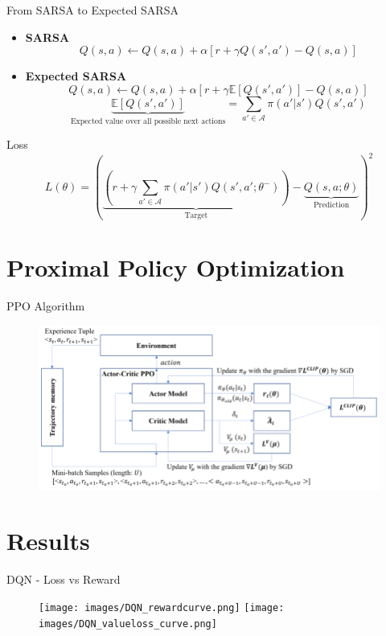 \documentclass[serif]{beamer}  %
\begin{document}
\begin{frame}{From SARSA to Expected SARSA}
    \begin{itemize}
        \item \textbf{SARSA}
        $$Q(s, a) \leftarrow Q(s, a) + \alpha \left[ r + \gamma Q(s', a') - Q(s, a) \right]$$
        \item \textbf{Expected SARSA}
        $$Q(s, a) \leftarrow Q(s, a) + \alpha \left[ r + \gamma \mathbb{E}[Q(s', a')] - Q(s, a) \right]$$
        $$\underbrace{\mathbb{E}[Q(s', a')]}_{\text{Expected value over all possible next actions}} = \sum_{a' \in \mathcal{A}} \pi(a'|s') Q(s', a')$$
    \end{itemize}
\end{frame}

\begin{frame}{Loss}
$$L(\theta) = \left( \underbrace{\left( r + \gamma \sum_{a' \in \mathcal{A}} \pi(a'|s') Q(s', a'; \theta^-) \right)}_{\text{Target}} - \underbrace{Q(s, a; \theta)}_{\text{Prediction}} \right)^2$$
\end{frame}

\section{Proximal Policy Optimization}

\begin{frame}{PPO Algorithm}
    \begin{figure}
        \centering
        \includegraphics[width=\linewidth]{images/PPO_diagram.png}
    \end{figure}
\end{frame}

\section{Results}

\begin{frame}{DQN - Loss vs Reward}
    \begin{figure}
        \centering
        \texttt{[image: images/DQN\_rewardcurve.png]}
        \texttt{[image: images/DQN\_valueloss\_curve.png]}
    \end{figure}
\end{frame}
\end{document}
